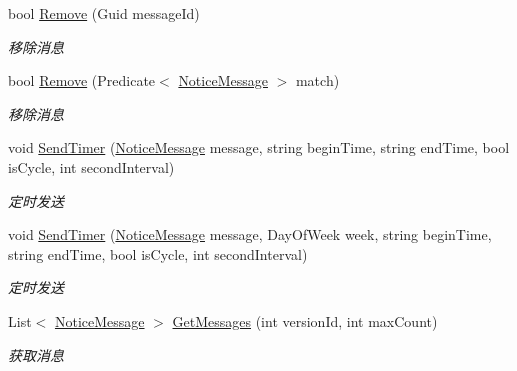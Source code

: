 \begin{DoxyCompactItemize}
bool \mbox{\hyperlink{class_t_net_1_1_message_1_1_broadcast_service_a8054c86d758370b540e602ca7163ce5e}{Remove}} (Guid message\+Id)
\begin{DoxyCompactList}\small\item\em 移除消息 \end{DoxyCompactList}\item 
bool \mbox{\hyperlink{class_t_net_1_1_message_1_1_broadcast_service_affa11f7e915ceb928701abd35609694c}{Remove}} (Predicate$<$ \mbox{\hyperlink{class_t_net_1_1_message_1_1_notice_message}{Notice\+Message}} $>$ match)
\begin{DoxyCompactList}\small\item\em 移除消息 \end{DoxyCompactList}\item 
void \mbox{\hyperlink{class_t_net_1_1_message_1_1_broadcast_service_a20899b271214c545784a3d1481f3965a}{Send\+Timer}} (\mbox{\hyperlink{class_t_net_1_1_message_1_1_notice_message}{Notice\+Message}} message, string begin\+Time, string end\+Time, bool is\+Cycle, int second\+Interval)
\begin{DoxyCompactList}\small\item\em 定时发送 \end{DoxyCompactList}\item 
void \mbox{\hyperlink{class_t_net_1_1_message_1_1_broadcast_service_ab9b0c9f3be5fee94d7fc5c3406e4c27c}{Send\+Timer}} (\mbox{\hyperlink{class_t_net_1_1_message_1_1_notice_message}{Notice\+Message}} message, Day\+Of\+Week week, string begin\+Time, string end\+Time, bool is\+Cycle, int second\+Interval)
\begin{DoxyCompactList}\small\item\em 定时发送 \end{DoxyCompactList}\item 
List$<$ \mbox{\hyperlink{class_t_net_1_1_message_1_1_notice_message}{Notice\+Message}} $>$ \mbox{\hyperlink{class_t_net_1_1_message_1_1_broadcast_service_a0318c6f8ae57ed66119f88a385626126}{Get\+Messages}} (int version\+Id, int max\+Count)
\begin{DoxyCompactList}\small\item\em 获取消息 \end{DoxyCompactList}\end{DoxyCompactItemize}
